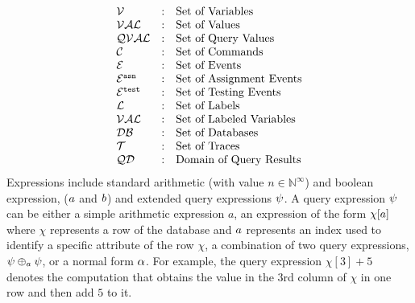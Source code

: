 \[
\begin{array}{lll}
\mathcal{V} & : & \mbox{Set of Variables}  
\\ 
%
\mathcal{VAL} & : & \mbox{Set of Values} 
\\ 
%
\mathcal{QVAL} & : & \mbox{Set of Query Values} 
\\ 
%
\cdom & : & \mbox{Set of Commands} 
\\ 
%
\eventset  & : & \mbox{Set of Events}  
\\
%
\eventset^{\asn}  & : & \mbox{Set of Assignment Events}  
\\
%
\eventset^{\test}  & : & \mbox{Set of Testing Events}  
\\
%
\ldom  & : & \mbox{Set of Labels}  
\\
\mathcal{VAL}  & : & \mbox{Set of Labeled Variables}  
\\
\dbdom  & : & \mbox{{Set of Databases}} 
\\
%
{\mathcal{T}} & : & \mbox{Set of Traces}
\\
%
\qdom & : & \mbox{{Domain of Query Results}}\\
\end{array}
\]
%
Expressions include
standard arithmetic (with value $n \in \mathbb{N}^{\infty}$) and boolean expression, ($a$ and $b$) and extended query expressions $\psi$.
A query expression $\psi$ can be either a simple arithmetic expression $a$, an expression of the form $\chi[a]$ where $\chi$ represents a row of the database  and  $a$ represents an index used to identify a specific attribute of the row $\chi$, a combination of two query expressions, $\psi \oplus_{a} \psi$, or a normal form $\alpha$.
For example, the query expression $\chi[3] + 5$  denotes the computation that
obtains
the value in the $3$rd column of $\chi$ in one row and then add $5$ to it.
\\
%
